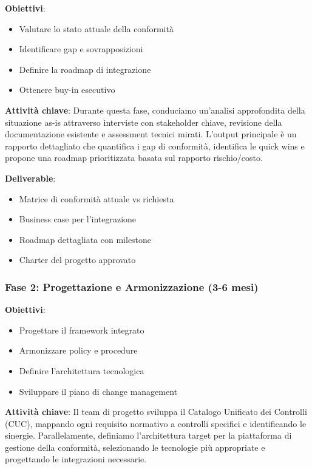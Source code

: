 \textbf{Obiettivi}:
\begin{itemize}
    \item Valutare lo stato attuale della conformità
    \item Identificare gap e sovrapposizioni
    \item Definire la roadmap di integrazione
    \item Ottenere buy-in esecutivo
\end{itemize}

\textbf{Attività chiave}:
Durante questa fase, conduciamo un'analisi approfondita della situazione as-is attraverso interviste con stakeholder chiave, revisione della documentazione esistente e assessment tecnici mirati. L'output principale è un rapporto dettagliato che quantifica i gap di conformità, identifica le quick wins e propone una roadmap prioritizzata basata sul rapporto rischio/costo.

\textbf{Deliverable}:
\begin{itemize}
    \item Matrice di conformità attuale vs richiesta
    \item Business case per l'integrazione
    \item Roadmap dettagliata con milestone
    \item Charter del progetto approvato
\end{itemize}

\subsubsection{Fase 2: Progettazione e Armonizzazione (3-6 mesi)}

\textbf{Obiettivi}:
\begin{itemize}
    \item Progettare il framework integrato
    \item Armonizzare policy e procedure
    \item Definire l'architettura tecnologica
    \item Sviluppare il piano di change management
\end{itemize}

\textbf{Attività chiave}:
Il team di progetto sviluppa il Catalogo Unificato dei Controlli (CUC), mappando ogni requisito normativo a controlli specifici e identificando le sinergie. Parallelamente, definiamo l'architettura target per la piattaforma di gestione della conformità, selezionando le tecnologie più appropriate e progettando le integrazioni necessarie.

